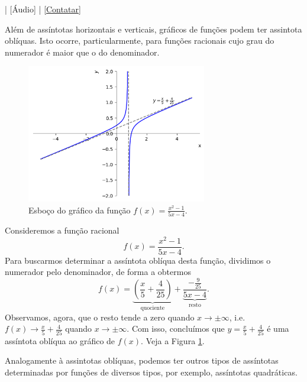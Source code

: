 \begin{flushright}
  [Vídeo] | [Áudio] | \href{https://phkonzen.github.io/notas/contato.html}{[Contatar]}
\end{flushright}

Além de assíntotas horizontais e verticais, gráficos de funções podem ter assintota oblíquas. Isto ocorre, particularmente, para funções racionais cujo grau do numerador é maior que o do denominador.

\begin{figure}[H]
  \centering
  \includegraphics[width=0.7\textwidth]{./cap_lim/dados/fig_ex_ass_obl/fig_ex_ass_obl}
  \caption{Esboço do gráfico da função $\displaystyle f(x) = \frac{x^2-1}{5x-4}$.}
  \label{fig:ex_ass_obl}
\end{figure}


\begin{ex}
  Consideremos a função racional
  \begin{equation}
    f(x) = \frac{x^2-1}{5x-4}.
  \end{equation}
  Para buscarmos determinar a assíntota oblíqua desta função, dividimos o numerador pelo denominador, de forma a obtermos
  \begin{equation}
    f(x) = \underbrace{\left(\frac{x}{5}+\frac{4}{25}\right)}_{\text{quociente}} + \underbrace{\frac{-\frac{9}{25}}{5x-4}}_{\text{resto}}.
  \end{equation}
  Observamos, agora, que o resto tende a zero quando $x\to\pm\infty$, i.e. $\displaystyle f(x)\to \frac{x}{5}+\frac{4}{25}$ quando $x\to\pm\infty$. Com isso, concluímos que $\displaystyle y = \frac{x}{5}+\frac{4}{25}$ é uma assíntota oblíqua ao gráfico de $f(x)$. Veja a Figura \ref{fig:ex_ass_obl}.
\end{ex}

\begin{obs}
  Analogamente à assintotas oblíquas, podemos ter outros tipos de assíntotas determinadas por funções de diversos tipos, por exemplo, assíntotas quadráticas.
\end{obs}

